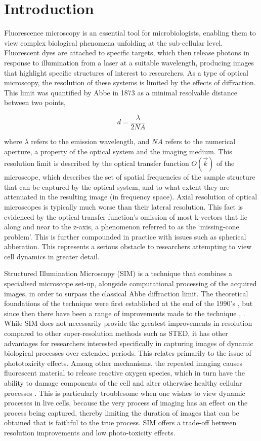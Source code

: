\documentclass[12pt]{article}
\newcommand\NA{\mathit{NA}}
\begin{document}
\newpage
\tableofcontents

\newpage
{}
\section{Introduction}

Fluorescence microscopy is an essential tool for microbiologists,
enabling them to view complex biological phenomena unfolding at the sub-cellular level.
Fluorescent dyes are attached to specific targets,
which then release photons in response to illumination from a laser at a suitable wavelength,
producing images that highlight specific structures of interest to researchers.
As a type of optical microscopy, the resolution of these systems is limited by the effects of diffraction.
This limit was quantified by Abbe \cite{abbe} in 1873 as a minimal resolvable distance between two points,

\[d=\frac{\lambda}{2\NA}\]

where $\lambda$ refers to the emission wavelength, and $\NA$ refers to the numerical aperture,
a property of the optical system and the imaging medium.
This resolution limit is described by the optical transfer function $O(\vec{k})$ of the microscope,
which describes the set of spatial frequencies of the sample structure that can be captured by the optical system,
and to what extent they are attenuated in the resulting image (in frequency space).
Axial resolution of optical microscopes is typically much worse than their lateral resolution.
This fact is evidenced by the optical transfer function's omission of most k-vectors that lie along and near to the z-axis,
a phenomenon referred to as the `missing-cone problem'.
This is further compounded in practice with issues such as spherical abberation.
This represents a serious obstacle to researchers attempting to view cell dynamics in greater detail.

Structured Illumination Microscopy (SIM) is a technique that combines a specialised microscope set-up,
alongside computational processing of the acquired images,
in order to surpass the classical Abbe diffraction limit.
The theoretical foundations of the technique were first established at the end of the 1990's \cite{SIM2000},
but since then there have been a range of improvements made to the technique \cite{simalgorithms}, \cite{simreview}.
While SIM does not necessarily provide the greatest improvements in resolution compared to other super-resolution methods such as STED,
it has other advantages for researchers interested specifically in capturing images of dynamic biological processes over extended periods.
This relates primarily to the issue of phototoxicity effects.
Among other mechanisms, the repeated imaging causes fluorescent material to release reactive oxygen species,
which in turn have the ability to damage components of the cell and alter otherwise healthy cellular processes \cite{phototoxicity}.
This is particularly troublesome when one wishes to view dynamic processes in live cells,
because the very process of imaging has an effect on the process being captured,
thereby limiting the duration of images that can be obtained that is faithful to the true process.
SIM offers a trade-off between resolution improvements and low photo-toxicity effects.
\end{document}
